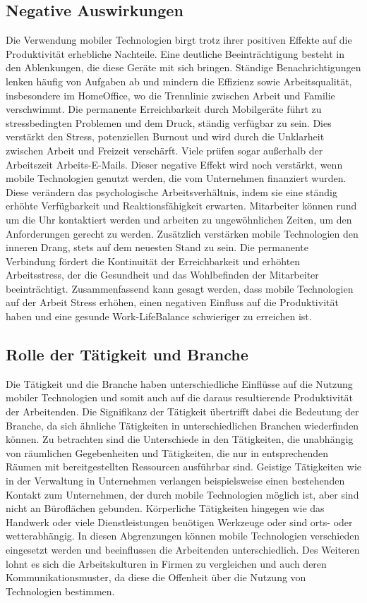 \documentclass[12pt,a4paper]{article}
\begin{document}
\subsection*{Negative Auswirkungen}
Die Verwendung mobiler Technologien birgt trotz ihrer positiven Effekte auf die Produktivität erhebliche Nachteile. Eine deutliche Beeinträchtigung besteht in den Ablenkungen, die diese Geräte mit sich bringen. Ständige Benachrichtigungen lenken häufig von Aufgaben ab und mindern die Effizienz sowie Arbeitsqualität, insbesondere im HomeOffice, wo die Trennlinie zwischen Arbeit und Familie verschwimmt. Die permanente Erreichbarkeit durch Mobilgeräte führt zu stressbedingten Problemen und dem Druck, ständig verfügbar zu sein. Dies verstärkt den Stress, potenziellen Burnout und wird durch die Unklarheit zwischen Arbeit und Freizeit verschärft. Viele prüfen sogar außerhalb der Arbeitszeit Arbeits-E-Mails. Dieser negative Effekt wird noch verstärkt, wenn mobile Technologien genutzt werden, die vom Unternehmen finanziert wurden. Diese verändern das psychologische Arbeitsverhältnis, indem sie eine ständig erhöhte Verfügbarkeit und Reaktionsfähigkeit erwarten. Mitarbeiter können rund um die Uhr kontaktiert werden und arbeiten zu ungewöhnlichen Zeiten, um den Anforderungen gerecht zu werden. Zusätzlich verstärken mobile Technologien den inneren Drang, stets auf dem neuesten Stand zu sein. Die permanente Verbindung fördert die Kontinuität der Erreichbarkeit und erhöhten Arbeitsstress, der die Gesundheit und das Wohlbefinden der Mitarbeiter beeinträchtigt. Zusammenfassend kann gesagt werden, dass mobile Technologien auf der Arbeit Stress erhöhen, einen negativen Einfluss auf die Produktivität haben und eine gesunde Work-LifeBalance schwieriger zu erreichen ist. 

\subsection*{Rolle der Tätigkeit und Branche}
Die Tätigkeit und die Branche haben unterschiedliche Einflüsse auf die Nutzung mobiler Technologien und somit auch auf die daraus resultierende Produktivität der Arbeitenden. 
Die Signifikanz der Tätigkeit übertrifft dabei die Bedeutung der Branche, da sich ähnliche Tätigkeiten in unterschiedlichen Branchen wiederfinden können. 
Zu betrachten sind die Unterschiede in den Tätigkeiten, die unabhängig von räumlichen Gegebenheiten und Tätigkeiten, die nur in entsprechenden Räumen mit bereitgestellten Ressourcen ausführbar sind. 
Geistige Tätigkeiten wie in der Verwaltung in Unternehmen verlangen beispielsweise einen bestehenden Kontakt zum Unternehmen, der durch mobile Technologien möglich ist, aber sind nicht an Büroflächen gebunden. 
Körperliche Tätigkeiten hingegen wie das Handwerk oder viele Dienstleistungen benötigen Werkzeuge oder sind orts- oder wetterabhängig. 
In diesen Abgrenzungen können mobile Technologien verschieden eingesetzt werden und beeinflussen die Arbeitenden unterschiedlich. 
Des Weiteren lohnt es sich die Arbeitskulturen in Firmen zu vergleichen und auch deren Kommunikationsmuster, da diese die Offenheit über die Nutzung von Technologien bestimmen.
\end{document}
